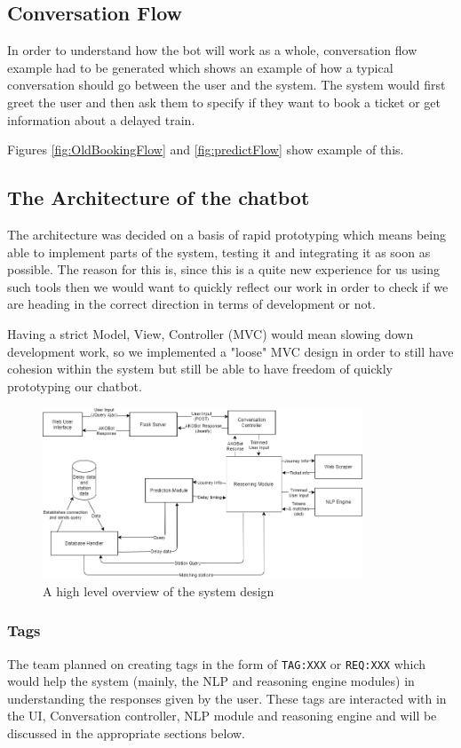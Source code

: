 \documentclass[11pt]{article}
\newcommand{\code}[1]{{\texttt{#1}}}
\begin{document}
    \subsection{Conversation Flow}
    In order to understand how the bot will work as a whole, conversation flow example had to be generated which shows an example of how a typical conversation should go between the user and the system. The system would first greet the user and then ask them to specify if they want to book a ticket or get information about a delayed train.

    Figures \ref{fig:OldBookingFlow} and \ref{fig:predictFlow} show example of this.
 
    \subsection{The Architecture of the chatbot}
    The architecture was decided on a basis of rapid prototyping which means being able to implement parts of the system, testing it and integrating it as soon as possible. The reason for this is, since this is a quite new experience for us using such tools then we would want to quickly reflect our work in order to check if we are heading in the correct direction in terms of development or not. 
    
    Having a strict Model, View, Controller (MVC) would mean slowing down development work, so we implemented a "loose" MVC design in order to still have cohesion within the system but still be able to have freedom of quickly prototyping our chatbot.
    
    \begin{figure}[!ht]
        \centering
        \includegraphics[width=0.85\textwidth]{ArchV1.png}
        \caption{A high level overview of the system design}
        \label{fig:ArchDesign}
    \end{figure}
    
        \subsubsection{Tags}
        The team planned on creating tags in the form of \code{TAG:XXX} or \code{REQ:XXX} which would help the system (mainly, the NLP and reasoning engine modules) in understanding the responses given by the user. These tags are interacted with in the UI, Conversation controller, NLP module and reasoning engine and will be discussed in the appropriate sections below.
        
\end{document}
